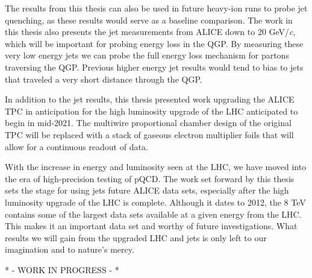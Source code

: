 The results from this thesis can also be used in future heavy-ion runs to probe jet quenching, as these results would serve as a baseline comparison.  The work in this thesis also presents the jet measurements from ALICE down to 20 GeV/\textit{c}, which will be important for probing energy loss in the QGP.  By measuring these very low energy jets we can probe the full energy loss mechanism for partons traversing the QGP.  Previous higher energy jet results would tend to bias to jets that traveled a very short distance through the QGP.

In addition to the jet results, this thesis presented work upgrading the ALICE TPC in anticipation for the high luminosity upgrade of the LHC anticipated to begin in mid-2021.  The multiwire proportional chamber design of the original TPC will be replaced with a stack of gaseous electron multiplier foils that will allow for a continuous readout of data.

With the increase in energy and luminosity seen at the LHC, we have moved into the era of high-precision testing of pQCD.  The work set forward by this thesis sets the stage for using jets future ALICE data sets, especially after the high luminosity upgrade of the LHC is complete.  Although it dates to 2012, the 8 TeV contains some of the largest data sets available at a given energy from the LHC.  This makes it an important data set and worthy of future investigations.  What results we will gain from the upgraded LHC and jets is only left to our imagination and to nature's mercy.

* - WORK IN PROGRESS - *
